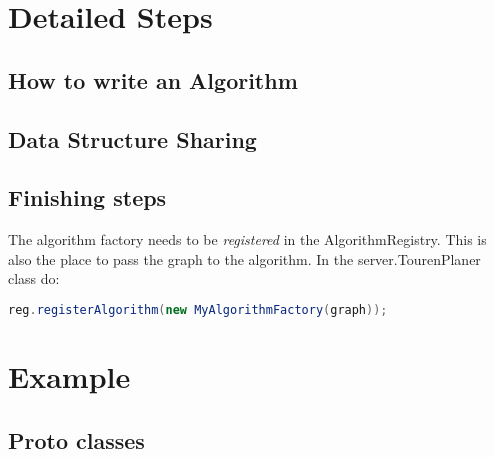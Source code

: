 \documentclass[ngerman,titlepage,parskip=true]{scrartcl}
\begin{document}
\section{Detailed Steps}

  \subsection{How to write an Algorithm}
  
  \subsection{Data Structure Sharing}

  \subsection{Finishing steps}
  The algorithm factory needs to be \textit{registered} in the AlgorithmRegistry. This is also the place to pass the graph to the algorithm.
  In the server.TourenPlaner class do:
  \begin{lstlisting}[language=java,caption=register your algorithm factory]
          reg.registerAlgorithm(new MyAlgorithmFactory(graph));
  \end{lstlisting}
  
  \section{Example}
	 \subsection{Proto classes}
	 
	 
\end{document}
